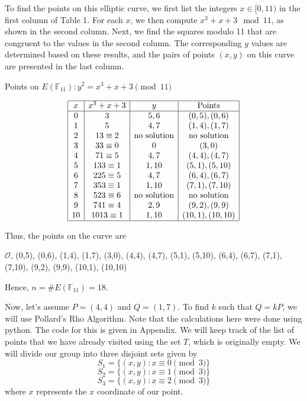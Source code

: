 \documentclass[11pt]{article}
\begin{document}
To find the points on this elliptic curve, we first list the integers \(x \in [0, 11)\) in the first column of Table 1. For each \(x\), we then compute \(x^3 + x + 3 \mod 11\), as shown in the second column. Next, we find the squares modulo 11 that are congruent to the values in the second column. The corresponding \(y\) values are determined based on these results, and the pairs of points \((x, y)\) on this curve are presented in the last column.

\begin{table}[h!]
\centering
\caption{Points on \(E(\mathbb{F}_{11}) : y^2 = x^3 + x + 3 \pmod{11}\)}
\[\begin{array}{|c|c|c|c|}
\hline
x & x^3 + x + 3 & y & \text{Points} \\
\hline
0 & 3 & 5, 6 & (0,5), (0,6) \\
1 & 5 & 4, 7 & (1,4), (1,7) \\
2 & 13 \equiv 2 & \text{no solution} & \text{no solution} \\
3 & 33 \equiv 0 & 0 & (3,0) \\
4 & 71 \equiv 5 & 4, 7 & (4,4), (4,7) \\
5 & 133 \equiv 1 & 1, 10 & (5,1), (5,10) \\
6 & 225 \equiv 5 & 4, 7 & (6,4), (6,7) \\
7 & 353 \equiv 1 & 1, 10 & (7,1), (7,10) \\
8 & 523 \equiv 6 & \text{no solution} & \text{no solution} \\
9 & 741 \equiv 4 & 2, 9 & (9,2), (9,9) \\
10 & 1013 \equiv 1 & 1, 10 & (10,1), (10,10) \\
\hline
\end{array}\]
\end{table}
Thus, the points on the curve are
\begin{flushleft}
\(\mathcal{O}\), (0,5), (0,6), (1,4), (1,7), (3,0), (4,4), (4,7), (5,1), (5,10), (6,4), (6,7), (7,1), (7,10), (9,2), (9,9), (10,1), (10,10)
\end{flushleft}

Hence, \(n=\#E(\mathbb{F}_{11})=18\).

\vspace{0.3cm}
 
Now, let's assume \(P=(4, 4)\) and \(Q=(1,7)\). To find \(k\) such that \(Q=kP\), we will use Pollard's Rho Algorithm. Note that the calculations here were done using python. The code for this is given in Appendix.
We will keep track of the list of points that we have already visited using the set \(T\), which is originally empty. We will divide our group into three disjoint sets given by
\[S_1=\{(x,y):x\equiv0 \pmod 3\}\]
\[S_2=\{(x,y):x\equiv1 \pmod 3\}\]
\[S_3=\{(x,y):x\equiv2 \pmod 3\}\]
where \(x\) represents the \(x\) coordinate of our point.
\end{document}

